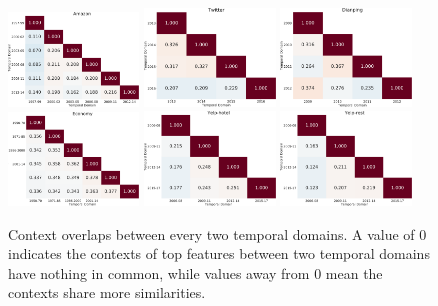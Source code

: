 \begin{figure}[tb!]
\centering
\includegraphics[width=0.31\textwidth]{images/chapter3/ctt_shift/amazon.pdf}
\includegraphics[width=0.31\textwidth]{images/chapter3/ctt_shift/vaccine.pdf}
\includegraphics[width=0.31\textwidth]{images/chapter3/ctt_shift/dianping.pdf}
\newline
\includegraphics[width=0.31\textwidth]{images/chapter3/ctt_shift/economy.pdf}
\includegraphics[width=0.31\textwidth]{images/chapter3/ctt_shift/yelp_hotel.pdf}
\includegraphics[width=0.31\textwidth]{images/chapter3/ctt_shift/yelp_rest.pdf}
\caption{Context overlaps between every two temporal domains. A value of 0 indicates the contexts of top features between two temporal domains have nothing in common, while values away from 0 mean the contexts share more similarities.}
\label{chap3:fig:ctt}
\end{figure}

